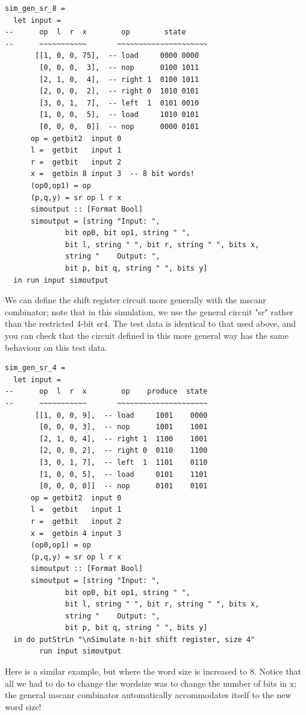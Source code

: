 \documentclass[a4paper,openany,fleqn]{book}
\begin{document}
\begin{verbatim}
sim_gen_sr_8 =
  let input =
--      op  l  r  x        op        state
--      ~~~~~~~~~~~       ~~~~~~~~~~~~~~~~~~~~~
       [[1, 0, 0, 75],  -- load     0000 0000
        [0, 0, 0,  3],  -- nop      0100 1011
        [2, 1, 0,  4],  -- right 1  0100 1011
        [2, 0, 0,  2],  -- right 0  1010 0101
        [3, 0, 1,  7],  -- left  1  0101 0010
        [1, 0, 0,  5],  -- load     1010 0101
        [0, 0, 0,  0]]  -- nop      0000 0101
      op = getbit2  input 0
      l =  getbit   input 1
      r =  getbit   input 2
      x =  getbin 8 input 3  -- 8 bit words!
      (op0,op1) = op
      (p,q,y) = sr op l r x
      simoutput :: [Format Bool]
      simoutput = [string "Input: ",
              bit op0, bit op1, string " ",
              bit l, string " ", bit r, string " ", bits x,
              string "    Output: ",
              bit p, bit q, string " ", bits y]
  in run input simoutput
\end{verbatim}

We can define the shift register circuit more generally with the
mscanr combinator; note that in this simulation, we use the general
circuit "sr" rather than the restricted 4-bit sr4.  The test data
is identical to that used above, and you can check that the circuit
defined in this more general way has the same behaviour on this
test data.

\begin{verbatim}
sim_gen_sr_4 =
  let input =
--      op  l  r  x        op    produce  state
--      ~~~~~~~~~~~       ~~~~~~~~~~~~~~~~~~~~~
       [[1, 0, 0, 9],  -- load     1001    0000
        [0, 0, 0, 3],  -- nop      1001    1001
        [2, 1, 0, 4],  -- right 1  1100    1001
        [2, 0, 0, 2],  -- right 0  0110    1100
        [3, 0, 1, 7],  -- left  1  1101    0110
        [1, 0, 0, 5],  -- load     0101    1101
        [0, 0, 0, 0]]  -- nop      0101    0101
      op = getbit2  input 0
      l =  getbit   input 1
      r =  getbit   input 2
      x =  getbin 4 input 3
      (op0,op1) = op
      (p,q,y) = sr op l r x
      simoutput :: [Format Bool]
      simoutput = [string "Input: ",
              bit op0, bit op1, string " ",
              bit l, string " ", bit r, string " ", bits x,
              string "    Output: ",
              bit p, bit q, string " ", bits y]
  in do putStrLn "\nSimulate n-bit shift register, size 4"
        run input simoutput
\end{verbatim}


Here is a similar example, but where the word size is increased to
8.  Notice that all we had to do to change the wordsize was to
change the number of bits in x; the general mscanr combinator
automatically accommodates itself to the new word size!
\end{document}
